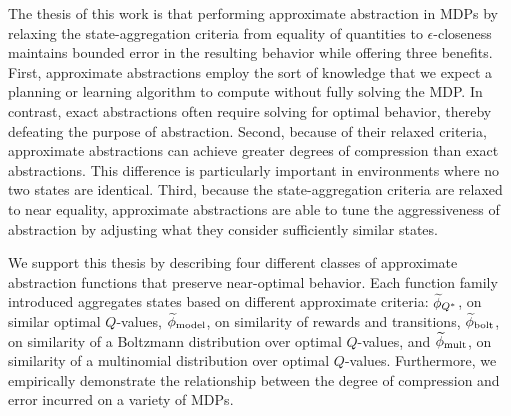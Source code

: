 The thesis of this work is that performing approximate abstraction in \acp{MDP} by relaxing the state-aggregation criteria from equality of quantities to $\epsilon$-closeness maintains bounded error in the resulting behavior while offering three benefits. First, approximate abstractions employ the sort of knowledge that we expect a planning or learning algorithm to compute without fully solving the \ac{MDP}. In contrast, exact abstractions often require solving for optimal behavior, thereby defeating the purpose of abstraction. Second, because of their relaxed criteria, approximate abstractions can achieve greater degrees of compression than exact abstractions. This difference is particularly important in environments where no two states are identical.  Third, because the state-aggregation criteria are relaxed to near equality, approximate abstractions are able to tune the aggressiveness of abstraction by adjusting what they consider sufficiently similar states. 

We support this thesis by describing four different classes of approximate abstraction functions that preserve near-optimal behavior. Each function family introduced aggregates states based on different approximate criteria: $\widetilde \phi_{Q^*}$, on similar optimal $Q$-values, $\widetilde \phi_{\text{model}}$, on similarity of rewards and transitions, $\widetilde \phi_{\text{bolt}}$, on similarity of a Boltzmann distribution over optimal $Q$-values, and $\widetilde \phi_{\text{mult}}$, on similarity of a multinomial distribution over optimal $Q$-values. Furthermore, we empirically demonstrate the relationship between the degree of compression and error incurred on a variety of \acp{MDP}.

